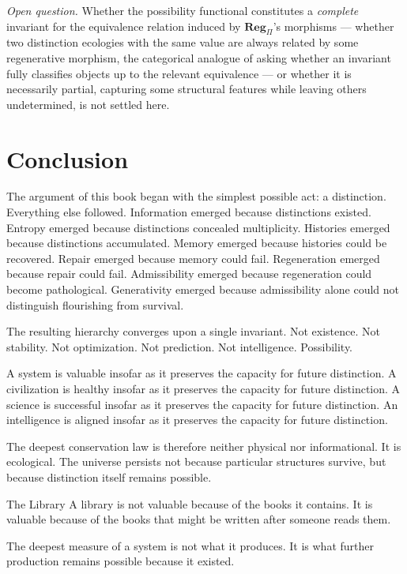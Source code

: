 \documentclass[12pt,twoside,openright]{book}
\begin{document}
\emph{Open question.} Whether the possibility functional
constitutes a \emph{complete} invariant for the equivalence
relation induced by $\mathbf{Reg}_\Pi$'s morphisms --- whether two
distinction ecologies with the same value are always related by
some regenerative morphism, the categorical analogue of asking
whether an invariant fully classifies objects up to the relevant
equivalence --- or whether it is necessarily partial, capturing
some structural features while leaving others undetermined, is
not settled here.

\section{Conclusion}
\label{sec:ch31-conclusion}

The argument of this book began with the simplest possible
act: a distinction. Everything else followed. Information
emerged because distinctions existed. Entropy emerged
because distinctions concealed multiplicity. Histories
emerged because distinctions accumulated. Memory emerged
because histories could be recovered. Repair emerged because
memory could fail. Regeneration emerged because repair could
fail. Admissibility emerged because regeneration could
become pathological. Generativity emerged because
admissibility alone could not distinguish flourishing from
survival.

The resulting hierarchy converges upon a single invariant.
Not existence. Not stability. Not optimization. Not
prediction. Not intelligence. Possibility.

A system is valuable insofar as it preserves the capacity
for future distinction. A civilization is healthy insofar as
it preserves the capacity for future distinction. A science
is successful insofar as it preserves the capacity for
future distinction. An intelligence is aligned insofar as it
preserves the capacity for future distinction.

The deepest conservation law is therefore neither physical
nor informational. It is ecological. The universe persists
not because particular structures survive, but because
distinction itself remains possible.

\begin{distinctionaside}{The Library}
A library is not valuable because of the books it contains.
It is valuable because of the books that might be written
after someone reads them.

The deepest measure of a system is not what it produces. It
is what further production remains possible because it
existed.
\end{distinctionaside}
\end{document}
